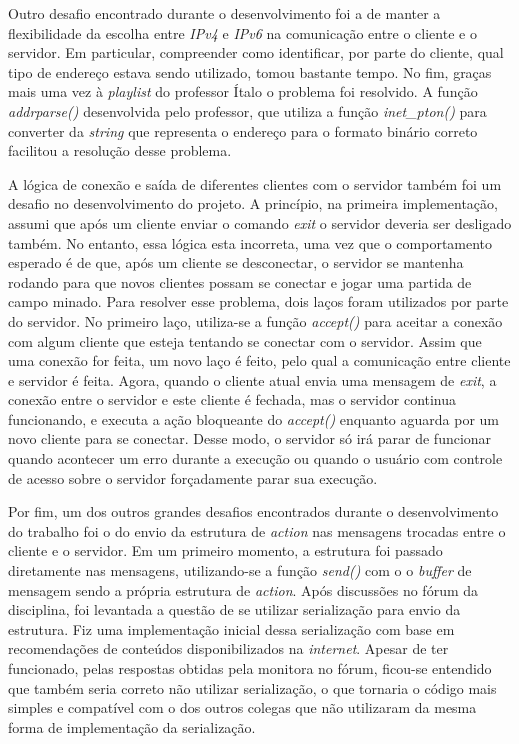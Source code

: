 \documentclass{article}
\begin{document}
Outro desafio encontrado durante o desenvolvimento foi a de manter a
flexibilidade da escolha entre \textit{IPv4} e \textit{IPv6} na comunicação
entre o cliente e o servidor. Em particular, compreender como identificar, por
parte do cliente, qual tipo de endereço estava sendo utilizado, tomou bastante
tempo. No fim,
graças mais uma vez à \textit{playlist} do professor Ítalo o problema foi
resolvido. A função \textit{addrparse()} desenvolvida pelo professor, que
utiliza a função \textit{inet\_pton()} para converter da \textit{string} que
representa o endereço para o formato binário correto
facilitou a resolução desse problema.

A lógica de conexão e saída de diferentes clientes com o servidor também foi um
desafio no desenvolvimento do projeto. A princípio,
na primeira implementação, assumi que após um cliente enviar o comando
\textit{exit} o servidor deveria ser desligado também. No entanto, essa lógica
esta
incorreta, uma vez que o comportamento esperado é de que, após um cliente se
desconectar, o servidor se mantenha rodando para que novos clientes possam se
conectar e jogar uma partida de
campo minado. Para resolver esse problema, dois laços foram utilizados por
parte do servidor. No primeiro laço, utiliza-se a função \textit{accept()} para
aceitar a conexão com
algum cliente que esteja tentando se conectar com o servidor. Assim que uma
conexão for feita, um novo laço é feito, pelo qual a comunicação entre cliente
e servidor é feita. Agora, quando
o cliente atual envia uma mensagem de \textit{exit}, a conexão entre o servidor
e este cliente é fechada, mas o servidor continua funcionando, e executa a ação
bloqueante do \textit{accept()} enquanto aguarda por um novo cliente para
se conectar. Desse modo, o servidor só irá parar de funcionar quando acontecer
um erro durante a execução ou quando o usuário com controle de acesso sobre o
servidor forçadamente parar sua execução.

Por fim, um dos outros grandes desafios encontrados durante o desenvolvimento
do trabalho foi o do envio da estrutura de \textit{action} nas mensagens
trocadas entre
o cliente e o servidor. Em um primeiro momento, a estrutura foi passado
diretamente nas mensagens, utilizando-se a função \textit{send()} com o o \textit{buffer} de mensagem
sendo a própria estrutura de \textit{action}. Após discussões no fórum da disciplina, foi levantada a questão de se utilizar
serialização para envio da estrutura. Fiz uma implementação inicial dessa serialização com base em recomendações de conteúdos
disponibilizados na \textit{internet}. Apesar de ter funcionado, pelas respostas obtidas pela monitora no fórum, ficou-se entendido que
também seria correto não utilizar serialização, o que tornaria o código mais simples e compatível com o dos outros colegas que não utilizaram
da mesma forma de implementação da serialização.
\end{document}
